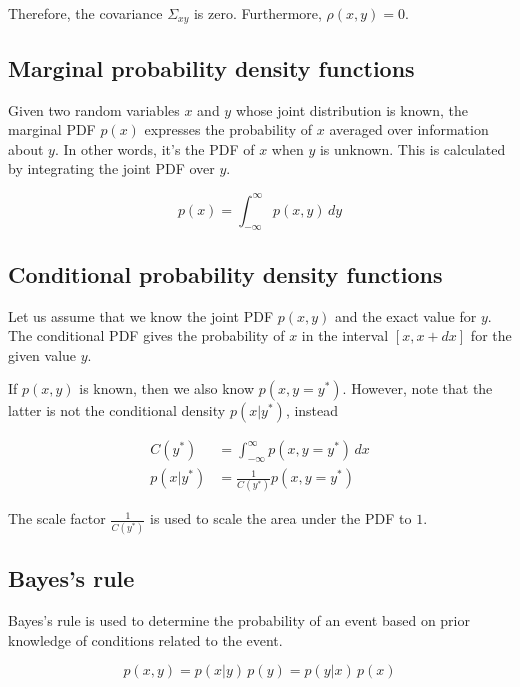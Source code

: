 Therefore, the covariance $\Sigma_{xy}$ is zero. Furthermore, $\rho(x, y) = 0$.

\subsection{Marginal probability density functions}

Given two random variables $x$ and $y$ whose joint distribution is known, the
marginal PDF $p(x)$ expresses the probability of $x$ averaged over information
about $y$. In other words, it's the PDF of $x$ when $y$ is unknown. This is
calculated by integrating the joint PDF over $y$.

\begin{equation*}
  p(x) = \int_{-\infty}^\infty p(x, y) \,dy
\end{equation*}

\subsection{Conditional probability density functions}

Let us assume that we know the joint PDF $p(x, y)$ and the exact value for $y$.
The conditional PDF gives the probability of $x$ in the interval $[x, x + dx]$
for the given value $y$.

If $p(x, y)$ is known, then we also know $p(x, y = y^\ast)$. However, note that
the latter is not the conditional density $p(x|y^\ast)$, instead

\begin{align*}
  C(y^\ast) &= \int_{-\infty}^\infty p(x, y = y^\ast) \,dx \\
  p(x|y^\ast) &= \frac{1}{C(y^\ast)} p(x, y = y^\ast)
\end{align*}

The scale factor $\frac{1}{C(y^\ast)}$ is used to scale the area under the PDF
to $1$.

\subsection{Bayes's rule}

Bayes's rule is used to determine the probability of an event based on prior
knowledge of conditions related to the event.

\begin{equation*}
  p(x, y) = p(x|y) \,p(y) = p(y|x) \,p(x)
\end{equation*}

